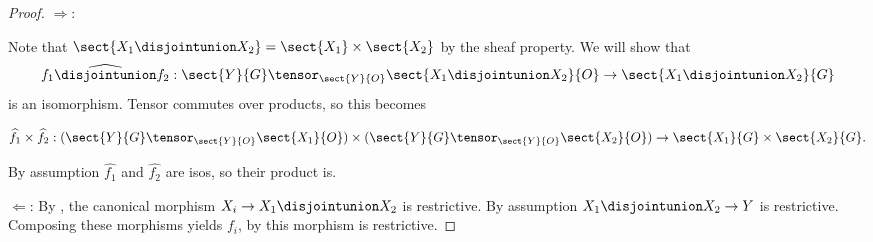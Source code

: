 
\begin{proof}
$\Rightarrow$:

Note that $\sect{X_1 \disjointunion X_2} = \sect{X_1} \times \sect{X_2}$ by the sheaf property.
We will show that
\[
\widehat{f_1\disjointunion f_2}:\sect{Y}{G} \tensor_{\sect{Y}{O}} \sect{X_1 \disjointunion X_2}{O} \rightarrow \sect{X_1 \disjointunion X_2}{G}
\]
is an isomorphism. 
Tensor commutes over products, so this becomes

\[
\widehat{f_1} \times \widehat{f_2}:(\sect{Y}{G} \tensor_{\sect{Y}{O}} \sect{X_1}{O}) 
\times (\sect{Y}{G} \tensor_{\sect{Y}{O}} \sect{X_2}{O}) 
\rightarrow \sect{X_1}{G} \times \sect{X_2}{G}.
\]

By assumption $\widehat{f_1}$ and $\widehat{f_2}$ are isos, so their product is.

$\Leftarrow$:
By , the canonical morphism $X_i \rightarrow X_1 \disjointunion X_2$ is restrictive.
By assumption $X_1 \disjointunion X_2 \rightarrow Y$ is restrictive.
Composing these morphisms yields $f_i$, by  this morphism is restrictive.
\end{proof}
